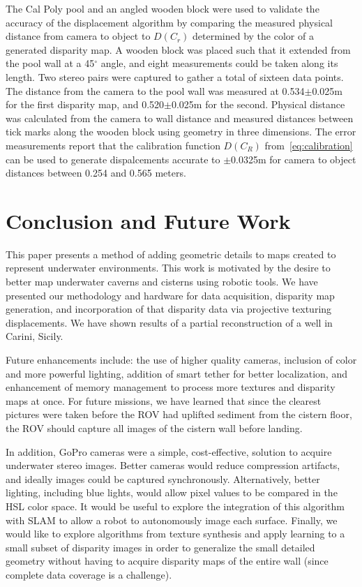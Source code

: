 \documentclass{llncs}
\begin{document}
The Cal Poly pool and an angled wooden block were used to validate the accuracy of the displacement algorithm by comparing the measured physical distance from camera to object to $D(C_r)$ determined by the color of a generated disparity map. A wooden block was placed such that it extended from the pool wall at a 45$^{\circ}$ angle, and eight measurements could be taken along its length. Two stereo pairs were captured to gather a total of sixteen data points. The distance from the camera to the pool wall was measured at 0.534$\pm$0.025m for the first disparity map, and 0.520$\pm$0.025m for the second. Physical distance was calculated from the camera to wall distance and measured distances between tick marks along the wooden block using geometry in three dimensions. The error measurements report that the calibration function $D(C_R)$ from~\eqref{eq:calibration} can be used to generate dispalcements accurate to $\pm$0.0325m for camera to object distances between 0.254 and 0.565 meters.

\section{Conclusion and Future Work}
\label{sec:conclusion}
\noindent This paper presents a method of adding geometric details to maps created to represent underwater environments. 
This work is motivated by the desire to better map underwater caverns and cisterns using robotic tools.  We have presented our methodology and hardware for data acquisition, disparity map generation, and incorporation of that disparity data via projective texturing displacements.  We have shown results of a partial reconstruction of a well in Carini, Sicily.

Future enhancements include: the use of higher quality cameras, inclusion of color and more powerful lighting, addition of smart tether for better localization, and enhancement of memory management to process more textures and disparity maps at once.
For future missions, we have learned that since the clearest pictures were taken before the ROV had uplifted sediment from the cistern floor, the ROV should capture all images of the cistern wall before landing. 

In addition, GoPro cameras were a simple, cost-effective, solution to acquire underwater stereo images.
Better cameras would reduce compression artifacts, and ideally images could be captured synchronously.
Alternatively, better lighting, including blue lights, would allow pixel values to be compared in the HSL color space.
It would be useful to explore the integration of this algorithm with SLAM to allow a robot to autonomously image each surface. Finally, we would like to explore algorithms from texture synthesis and apply learning to a small subset of disparity images in order to generalize the small detailed geometry without having to acquire disparity maps of the entire wall (since complete data coverage is a challenge).
\end{document}
